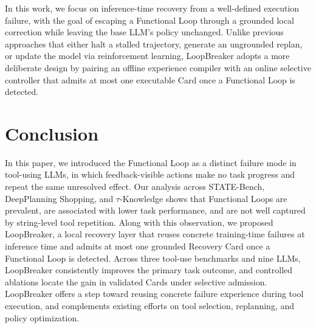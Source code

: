\documentclass[letterpaper]{article}
\begin{document}
In this work, we focus on inference-time recovery from a well-defined execution failure, with the goal of escaping a Functional Loop through a grounded local correction while leaving the base LLM's policy unchanged. Unlike previous approaches that either halt a stalled trajectory, generate an ungrounded replan, or update the model via reinforcement learning, LoopBreaker adopts a more deliberate design by pairing an offline experience compiler with an online selective controller that admits at most one executable Card once a Functional Loop is detected.


\section{Conclusion}

In this paper, we introduced the Functional Loop as a distinct failure mode in tool-using LLMs, in which feedback-visible actions make no task progress and repeat the same unresolved effect. Our analysis across STATE-Bench, DeepPlanning Shopping, and $\tau$-Knowledge shows that Functional Loops are prevalent, are associated with lower task performance, and are not well captured by string-level tool repetition. Along with this observation, we proposed LoopBreaker, a local recovery layer that reuses concrete training-time failures at inference time and admits at most one grounded Recovery Card once a Functional Loop is detected. Across three tool-use benchmarks and nine LLMs, LoopBreaker consistently improves the primary task outcome, and controlled ablations locate the gain in validated Cards under selective admission. LoopBreaker offers a step toward reusing concrete failure experience during tool execution, and complements existing efforts on tool selection, replanning, and policy optimization.


\end{document}
